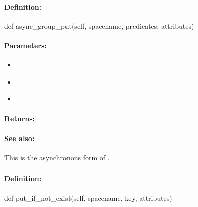 \paragraph{Definition:}
\begin{pythoncode}
def async_group_put(self, spacename, predicates, attributes)
\end{pythoncode}

\paragraph{Parameters:}
\begin{itemize}[noitemsep]
\item {}\\

\item {}\\

\item {}\\

\end{itemize}

\paragraph{Returns:}


\paragraph{See also:}  This is the asynchronous form of .

\pagebreak
\subsubsection{}
\label{api:python:put_if_not_exist}


\paragraph{Definition:}
\begin{pythoncode}
def put_if_not_exist(self, spacename, key, attributes)
\end{pythoncode}

